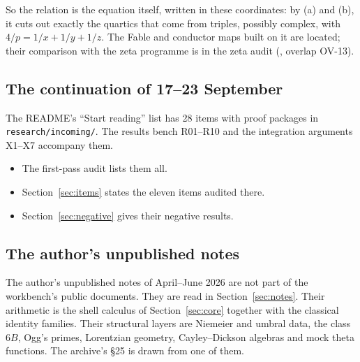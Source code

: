 So the relation is the equation itself, written in these coordinates: by (a) and (b), it cuts out exactly the quartics that come from triples, possibly complex, with $4/p=1/x+1/y+1/z$. The Fable and conductor maps built on it are \textsf{located}; their comparison with the zeta programme is in the zeta audit (, overlap OV-13).

\subsection{The continuation of 17--23 September}\label{ssec:continuation}

The README's ``Start reading'' list has 28 items with proof packages in \texttt{research/incoming/}. The results bench R01--R10 and the integration arguments X1--X7 accompany them.
\begin{itemize}
\item The first-pass audit  lists them all.
\item Section~\ref{sec:items} states the eleven items audited there.
\item Section~\ref{sec:negative} gives their negative results.
\end{itemize}

\subsection{The author's unpublished notes}\label{ssec:notescorpus}

The author's unpublished notes of April--June 2026 are not part of the workbench's public documents. They are read in Section~\ref{sec:notes}. Their arithmetic is the shell calculus of Section~\ref{sec:core} together with the classical identity families. Their structural layers are Niemeier and umbral data, the class $6B$, Ogg's primes, Lorentzian geometry, Cayley--Dickson algebras and mock theta functions. The archive's §25 is drawn from one of them.

